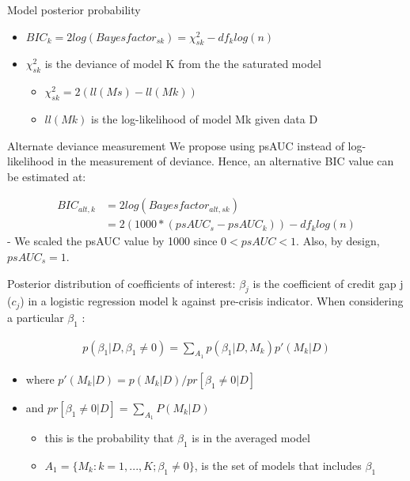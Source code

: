 \documentclass[
  ignorenonframetext,
]{beamer}
\providecommand{\tightlist}{%
  \setlength{\itemsep}{0pt}\setlength{\parskip}{0pt}}
\begin{document}
\begin{frame}{Model posterior probability}
\protect\hypertarget{model-posterior-probability-1}{}
\begin{itemize}
\tightlist
\item
  \(BIC_k = 2log (Bayesfactor_{sk}) = \chi^2_{sk} - df_klog(n)\)
\item
  \(\chi^2_{sk}\) is the deviance of model K from the the saturated
  model

  \begin{itemize}
  \tightlist
  \item
    \(\chi^2_{sk} = 2(ll(Ms) - ll(Mk))\)
  \item
    \(ll(Mk)\) is the log-likelihood of model Mk given data D
  \end{itemize}
\end{itemize}

\begin{block}{Alternate deviance measurement}
\protect\hypertarget{alternate-deviance-measurement}{}
We propose using psAUC instead of log-likelihood in the measurement of
deviance. Hence, an alternative BIC value can be estimated at:

\begin{align}
BIC_{alt,k} &= 2log (Bayesfactor_{alt,sk}) \\
&= 2(1000*(psAUC_s-psAUC_k)) - df_klog(n)
\end{align} - We scaled the psAUC value by 1000 since \(0<psAUC<1\).
Also, by design, \(psAUC_s=1\).
\end{block}
\end{frame}

\begin{frame}{Posterior distribution of coefficients of interest:}
\protect\hypertarget{posterior-distribution-of-coefficients-of-interest}{}
\(\beta_j\) is the coefficient of credit gap j (\(c_j\)) in a logistic
regression model k against pre-crisis indicator. When considering a
particular \(\beta_1\) :

\begin{align*}
p(\beta_1|D, \beta_1\ne 0) = \sum\nolimits_{A_1} p(\beta_1|D,M_k)p'(M_k|D)
\end{align*}

\begin{itemize}
\tightlist
\item
  where \(p'(M_k|D)=p(M_k|D)/ pr[\beta_1 \ne 0|D]\)
\item
  and \(pr[\beta_1 \ne 0|D] = \sum\limits_{A_1} P(M_k|D)\)

  \begin{itemize}
  \tightlist
  \item
    this is the probability that \(\beta_1\) is in the averaged model
  \item
    \(A_1= \{M_k: k=1,...,K; \beta_1 \ne 0\}\), is the set of models
    that includes \(\beta_1\)
  \end{itemize}
\end{itemize}
\end{frame}
\end{document}
